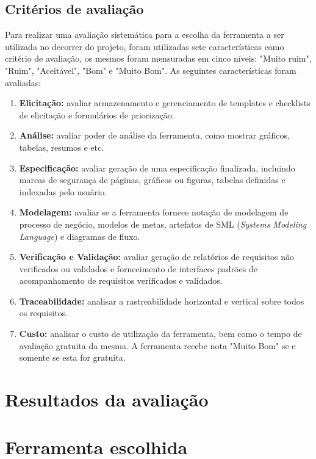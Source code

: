 \subsection{Critérios de avaliação}
Para realizar uma avaliação sistemática para a escolha da ferramenta a ser utilizada no decorrer do projeto, foram utilizadas sete características como critério de avaliação, os mesmos foram mensuradas em cinco níveis: "Muito ruim", "Ruim", "Aceitável", "Bom" e "Muito Bom". As seguintes características foram avaliadas:
\begin{enumerate}
	\item \textbf{Elicitação:} avaliar armazenamento e gerenciamento de templates e checklists de elicitação e formulários de priorização.
	\item \textbf{Análise:} avaliar poder de análise da ferramenta, como mostrar gráficos, tabelas, resumos e etc.
	\item \textbf{Especificação:} avaliar geração de uma especificação finalizada, incluindo marcas de segurança de páginas, gráficos ou figuras, tabelas definidas e indexadas pelo usuário.
	\item \textbf{Modelagem:} avaliar se a ferramenta fornece notação de modelagem de processo de negócio, modelos de metas, artefatos de SML (\textit{Systems Modeling Language}) e diagramas de fluxo.
	\item \textbf{Verificação e Validação:} avaliar geração de relatórios de requisitos não verificados ou validados e fornecimento de interfaces padrões de acompanhamento de requisitos verificados e validados.
	\item \textbf{Traceabilidade:} analisar a rastreabilidade horizontal e vertical sobre todos os requisitos.
	\item \textbf{Custo:} analisar o custo de utilização da ferramenta, bem como o tempo de avaliação gratuita da mesma. A ferramenta recebe nota "Muito Bom" se e somente se esta for gratuita.
\end{enumerate}

\section{Resultados da avaliação}

\section{Ferramenta escolhida}
